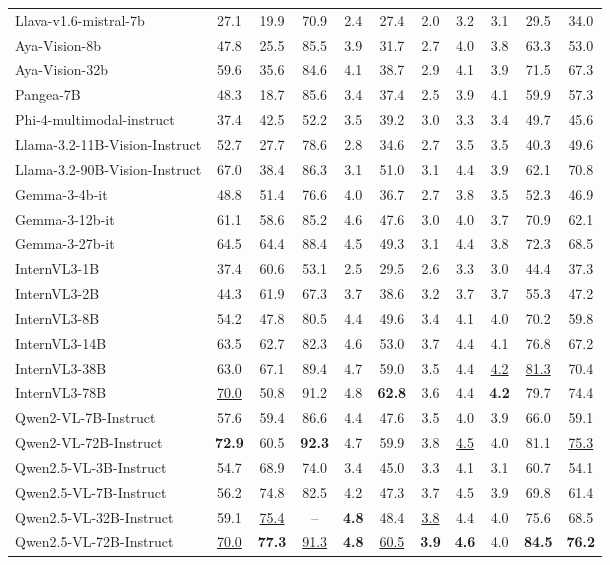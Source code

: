 \begin{table*}[t]
\begin{adjustbox}{max width=\linewidth}
\begin{tabular}{lcccccccccc}
Llava-v1.6-mistral-7b & 27.1 & 19.9 & 70.9 & 2.4 & 27.4 & 2.0 & 3.2 & 3.1 & 29.5 & 34.0 \\
Aya-Vision-8b & 47.8 & 25.5 & 85.5 & 3.9 & 31.7 & 2.7 & 4.0 & 3.8 & 63.3 & 53.0 \\
Aya-Vision-32b & 59.6 & 35.6 & 84.6 & 4.1 & 38.7 & 2.9 & 4.1 & 3.9 & 71.5 & 67.3 \\
Pangea-7B & 48.3 & 18.7 & 85.6 & 3.4 & 37.4 & 2.5 & 3.9 & 4.1 & 59.9 & 57.3 \\
Phi-4-multimodal-instruct & 37.4 & 42.5 & 52.2 & 3.5 & 39.2 & 3.0 & 3.3 & 3.4 & 49.7 & 45.6 \\
Llama-3.2-11B-Vision-Instruct & 52.7 & 27.7 & 78.6 & 2.8 & 34.6 & 2.7 & 3.5 & 3.5 & 40.3 & 49.6 \\
Llama-3.2-90B-Vision-Instruct & 67.0 & 38.4 & 86.3 & 3.1 & 51.0 & 3.1 & 4.4 & 3.9 & 62.1 & 70.8 \\
Gemma-3-4b-it & 48.8 & 51.4 & 76.6 & 4.0 & 36.7 & 2.7 & 3.8 & 3.5 & 52.3 & 46.9 \\
Gemma-3-12b-it & 61.1 & 58.6 & 85.2 & 4.6 & 47.6 & 3.0 & 4.0 & 3.7 & 70.9 & 62.1 \\
Gemma-3-27b-it & 64.5 & 64.4 & 88.4 & 4.5 & 49.3 & 3.1 & 4.4 & 3.8 & 72.3 & 68.5 \\
InternVL3-1B & 37.4 & 60.6 & 53.1 & 2.5 & 29.5 & 2.6 & 3.3 & 3.0 & 44.4 & 37.3 \\
InternVL3-2B & 44.3 & 61.9 & 67.3 & 3.7 & 38.6 & 3.2 & 3.7 & 3.7 & 55.3 & 47.2 \\
InternVL3-8B & 54.2 & 47.8 & 80.5 & 4.4 & 49.6 & 3.4 & 4.1 & 4.0 & 70.2 & 59.8 \\
InternVL3-14B & 63.5 & 62.7 & 82.3 & 4.6 & 53.0 & 3.7 & 4.4 & 4.1 & 76.8 & 67.2 \\
InternVL3-38B & 63.0 & 67.1 & 89.4 & 4.7 & 59.0 & 3.5 & 4.4 & \underline{4.2} & \underline{81.3} & 70.4 \\
InternVL3-78B & \underline{70.0} & 50.8 & 91.2 & 4.8 & \textbf{62.8} & 3.6 & 4.4 & \textbf{4.2} & 79.7 & 74.4 \\
Qwen2-VL-7B-Instruct & 57.6 & 59.4 & 86.6 & 4.4 & 47.6 & 3.5 & 4.0 & 3.9 & 66.0 & 59.1 \\
Qwen2-VL-72B-Instruct & \textbf{72.9} & 60.5 & \textbf{92.3} & 4.7 & 59.9 & 3.8 & \underline{4.5} & 4.0 & 81.1 & \underline{75.3} \\
Qwen2.5-VL-3B-Instruct & 54.7 & 68.9 & 74.0 & 3.4 & 45.0 & 3.3 & 4.1 & 3.1 & 60.7 & 54.1 \\
Qwen2.5-VL-7B-Instruct & 56.2 & 74.8 & 82.5 & 4.2 & 47.3 & 3.7 & 4.5 & 3.9 & 69.8 & 61.4 \\
Qwen2.5-VL-32B-Instruct & 59.1 & \underline{75.4} & -- & \textbf{4.8} & 48.4 & \underline{3.8} & 4.4 & 4.0 & 75.6 & 68.5 \\
Qwen2.5-VL-72B-Instruct & \underline{70.0} & \textbf{77.3} & \underline{91.3} & \textbf{4.8} & \underline{60.5} & \textbf{3.9} & \textbf{4.6} & 4.0 & \textbf{84.5} & \textbf{76.2} \\
\bottomrule
\end{tabular}
\end{adjustbox}
\end{table*}
\endgroup